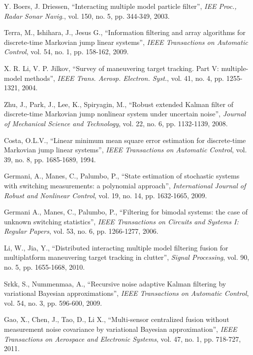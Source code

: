 \documentclass[12pt,draftcls,onecolumn]{IEEEtran}
\begin{document}
\begin{thebibliography}{99}
Y. Boers, J. Driessen, ``Interacting multiple model particle
filter'', \emph{IEE Proc., Radar Sonar Navig.}, vol. 150, no. 5, pp.
344-349, 2003.


Terra, M., Ishihara, J., Jesus G., ``Information filtering and array
algorithms for discrete-time Markovian jump linear systems'',
\emph{IEEE Transactions on Automatic Control}, vol. 54, no. 1, pp.
158-162, 2009.


X. R. Li, V. P. Jilkov, ``Survey of maneuvering target tracking.
Part V: multiple-model methods'', \emph{IEEE Trans. Aerosp.
Electron. Syst.}, vol. 41, no. 4, pp. 1255-1321, 2004.



Zhu, J., Park, J., Lee, K., Spiryagin, M., ``Robust extended Kalman
filter of discrete-time Markovian jump nonlinear system under
uncertain noise'', \emph{Journal of Mechanical Science and
Technology}, vol. 22, no. 6, pp. 1132-1139, 2008.


Costa, O.L.V., ``Linear minimum mean square error estimation for
discrete-time Markovian jump linear systems'', \emph{IEEE
Transactions on Automatic Control}, vol. 39, no. 8, pp. 1685-1689,
1994.

Germani, A., Manes, C., Palumbo, P., ``State estimation of
stochastic systems with switching measurements: a polynomial
approach'', \emph{International Journal of Robust and Nonlinear
Control}, vol. 19, no. 14, pp. 1632-1665, 2009.

 Germani A.,
Manes, C., Palumbo, P., ``Filtering for bimodal systems: the case of
unknown switching statistics'', \emph{IEEE Transactions on Circuits
and Systems I: Regular Papers}, vol. 53, no. 6, pp. 1266-1277, 2006.


 Li, W., Jia,
Y., ``Distributed interacting multiple model  filtering
fusion for multiplatform maneuvering target tracking in clutter'',
\emph{Signal Processing}, vol. 90, no. 5, pp. 1655-1668, 2010.



Srkk, S., Nummenmaa, A., ``Recursive noise
adaptive Kalman filtering by variational Bayesian approximations'',
\emph{IEEE Transactions on Automatic Control}, vol. 54, no. 3, pp.
596-600, 2009.

Gao, X., Chen, J., Tao, D., Li X., ``Multi-sensor centralized fusion
without measurement noise covariance by variational Bayesian
approximation'', \emph{IEEE Transactions on Aerospace and Electronic
Systems}, vol. 47, no. 1, pp. 718-727, 2011.



\end{thebibliography}
\end{document}
